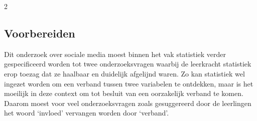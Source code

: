 \begin{multicols}{2}
    

    



            
\subsection*{Voorbereiden}

Dit onderzoek over sociale media moest binnen het vak statistiek verder gespecificeerd worden tot twee onderzoeksvragen waarbij de leerkracht statistiek erop toezag dat ze haalbaar en duidelijk afgelijnd waren. Zo kan statistiek wel ingezet worden om een verband tussen twee variabelen te ontdekken, maar is het moeilijk in deze context om tot besluit van een oorzakelijk verband te komen. Daarom moest voor veel onderzoeksvragen zoals gesuggereerd door de leerlingen het woord `invloed' vervangen worden door `verband'. 


\end{multicols}
